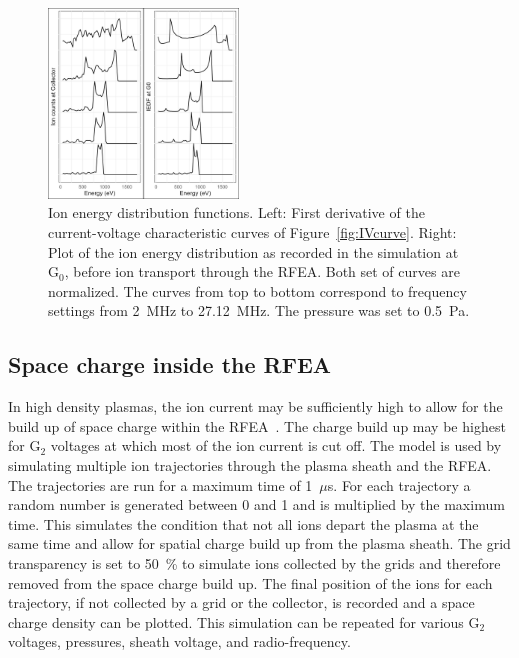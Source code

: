 \begin{figure}[htbp]
\centering
\includegraphics[width=0.45\textwidth]{Figures/FrequencyScan.jpeg}
\caption{Ion energy distribution functions. Left: First derivative of the current-voltage characteristic curves of Figure~\ref{fig:IVcurve}. Right: Plot of the ion energy distribution as recorded in the simulation at G$_0$, before ion transport through the RFEA. Both set of curves are normalized. The curves from top to bottom correspond to frequency settings from 2~MHz to 27.12~MHz. The pressure was set to 0.5~Pa.}
\label{fig:FrequencyScan}
\end{figure}





\subsection{Space charge inside the RFEA}
In high density plasmas, the ion current may be sufficiently high to allow for the build up of space charge within the RFEA~\cite{Hutchinson1987}. The charge build up may be highest for G$_2$ voltages at which most of the ion current is cut off. The model is used by simulating multiple ion trajectories through the plasma sheath and the RFEA. The trajectories are run for a maximum time of 1~$\mu$s. For each trajectory a random number is generated between 0 and 1 and is multiplied by the maximum time. This simulates the condition that not all ions depart the plasma at the same time and allow for spatial charge build up from the plasma sheath. The grid transparency is set to 50~\% to simulate ions collected by the grids and therefore removed from the space charge build up. The final position of the ions for each trajectory, if not collected by a grid or the collector, is recorded and a space charge density can be plotted. This simulation can be repeated for various G$_2$ voltages, pressures, sheath voltage, and radio-frequency.  

